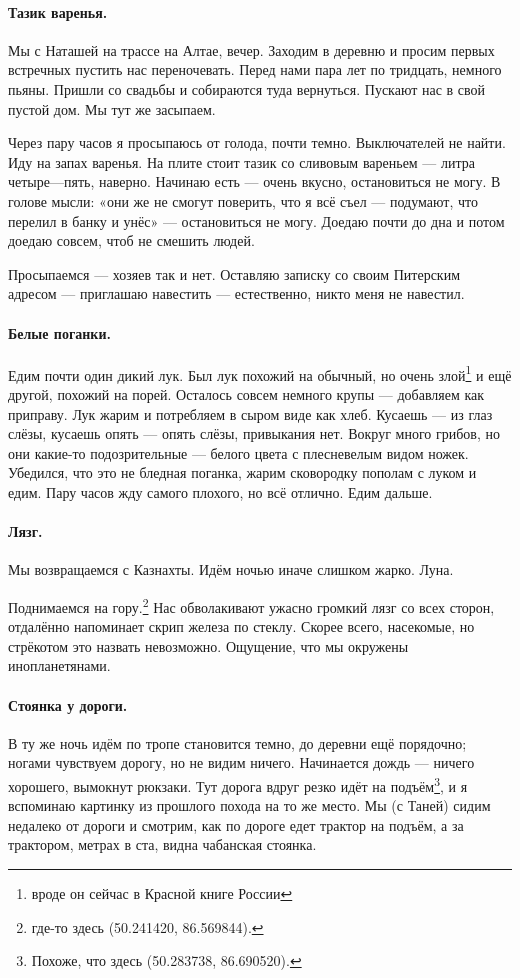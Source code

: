 \documentclass{book}
\begin{document}
\paragraph{Тазик варенья.}
Мы с Наташей на трассе на Алтае, вечер.
Заходим в деревню и просим первых встречных пустить нас переночевать.
Перед нами пара лет по тридцать, немного пьяны.
Пришли со свадьбы и собираются туда вернуться.
Пускают нас в свой пустой дом.
Мы тут же засыпаем.

Через пару часов я просыпаюсь от голода, почти темно.
Выключателей не найти.
Иду на запах варенья.
На плите стоит тазик со сливовым вареньем --- литра четыре---пять, наверно.
Начинаю есть --- очень вкусно, остановиться не могу.
В голове мысли: «они же не смогут поверить, что я всё съел --- подумают, что перелил в банку и унёс» --- остановиться не могу.
Доедаю почти до дна и потом доедаю совсем, чтоб не смешить людей.

Просыпаемся --- хозяев так и нет.
Оставляю записку со своим Питерским адресом --- приглашаю навестить --- естественно, никто меня не навестил.

\paragraph{Белые поганки.}
Едим почти один дикий лук.
Был лук похожий на обычный, но очень злой\footnote{вроде он сейчас в Красной книге России} и ещё другой, похожий на порей.
Осталось совсем немного крупы --- добавляем как приправу.
Лук жарим и потребляем в сыром виде как хлеб.
Кусаешь --- из глаз слёзы, кусаешь опять --- опять слёзы, привыкания нет.
Вокруг много грибов, но они какие-то подозрительные --- белого цвета с плесневелым видом ножек.
Убедился, что это не бледная поганка, жарим сковородку пополам с луком и едим.
Пару часов жду самого плохого, но всё отлично.
Едим дальше.

\paragraph{Лязг.}
Мы возвращаемся с Казнахты.
Идём ночью иначе слишком жарко.
Луна.

Поднимаемся на гору.\footnote{где-то здесь (50.241420, 86.569844).}
Нас обволакивают ужасно громкий лязг со всех сторон, отдалённо напоминает скрип железа по стеклу.
Скорее всего, насекомые, но стрёкотом это назвать невозможно.
Ощущение, что мы окружены инопланетянами.

\paragraph{Стоянка у дороги.}
В ту же ночь идём по тропе становится темно, до деревни ещё порядочно;
ногами чувствуем дорогу, но не видим ничего.
Начинается дождь --- ничего хорошего, вымокнут рюкзаки.
Тут дорога вдруг резко идёт на подъём\footnote{Похоже, что здесь (50.283738, 86.690520).}, и я вспоминаю картинку из прошлого похода на то же место.
Мы (с Таней) сидим недалеко от дороги и смотрим, как по дороге едет трактор на подъём,
а за трактором, метрах в ста, видна чабанская стоянка.
\end{document}
